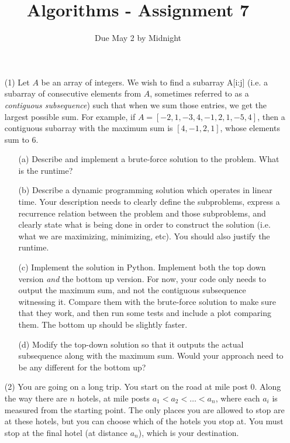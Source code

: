 \documentclass[12pt]{article}
\title{Algorithms - Assignment 7}
\date{Due May 2 by Midnight}
\begin{document}
\maketitle

\begin{enumerate}
    \item[(1)] Let $A$ be an array of integers. We wish to find a subarray A[i:j] (i.e. a subarray of consecutive elements from $A$, sometimes referred to as a 
    \emph{contiguous subsequence}) such that when we sum those entries, we get the largest possible sum. For example, if $A=[-2, 1, -3, 4, -1, 2, 1, -5, 4]$, then a contiguous subarray with the maximum sum is $[4,-1,2,1]$, whose elements sum to $6$.
    \begin{itemize}
        \item[(a)] Describe and implement a brute-force solution to the problem. What is the runtime? 
        \item[(b)] Describe a dynamic programming solution which operates in linear time. Your description needs to clearly define the subproblems, express a recurrence relation between the problem and those subproblems, and clearly state what is being done in order to construct the solution (i.e. what we are maximizing, minimizing, etc). You should also justify the runtime. 
        \item[(c)] Implement the solution in Python. Implement both the top down version \emph{and} the bottom up version. For now, your code only needs to output the maximum sum, and not the contiguous subsequence witnessing it. Compare them with the brute-force solution to make sure that they work, and then run some tests and include a plot comparing them. The bottom up should be slightly faster.
        \item[(d)] Modify the top-down solution so that it outputs the actual subsequence along with the maximum sum. Would your approach need to be any different for the bottom up? 
    \end{itemize}
    \item[(2)] You are going on a long trip. You start on the road at mile post 0. Along the way there are $n$ hotels, at mile posts $a_1 < a_2 < \ldots < a_n$, where each $a_i$ is measured from the starting point. The only places you are allowed to stop are at these hotels, but you can choose which of the hotels you stop at. You must stop at the final hotel (at distance $a_n$), which is your destination.
    

\end{enumerate}
\end{document}

